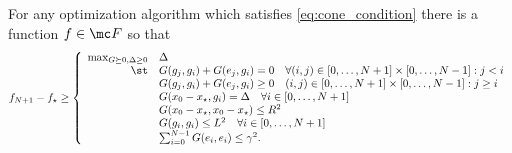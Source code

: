 \documentclass{article}
\begin{document}
\begin{theorem}\label{thm:lower-matrix}
    For any optimization algorithm which satisfies \eqref{eq:cone_condition} there is a function $f\in \mc F$ so that
    \begin{equation}
      \label{eq:universal_lb}
      f_{N+1}-f_\star\geq
      \left\{
        \begin{array}{rl}
          \max_{G\succeq 0, \Delta\geq 0}  & \Delta\\
          \st & G(g_j, g_i) + G(e_j, g_i)  = 0 \quad \forall (i, j) \in [0, \dots, N+1]\times [0, \dots, N-1]:  j< i \\
                                           & G(g_j, g_i) + G(e_j, g_i) \geq 0 \quad (i, j) \in [0, \dots, N+1]\times [0, \dots, N-1]:  j\geq i\\
                                           & G(x_0-x_\star, g_i)= \Delta\quad \forall i\in [0, \dots, N+1]\\
                                           & G(x_0-x_\star, x_0-x_\star) \leq R^2\\
                                           & G(g_i, g_i) \leq L^2\quad\forall i\in [0, \dots, N+1]\\
                                           & \sum_{i=0}^{N-1} G(e_i, e_i) \leq \gamma^2.
                                             
        \end{array}
      \right.
    \end{equation}
\end{theorem}
\end{document}
